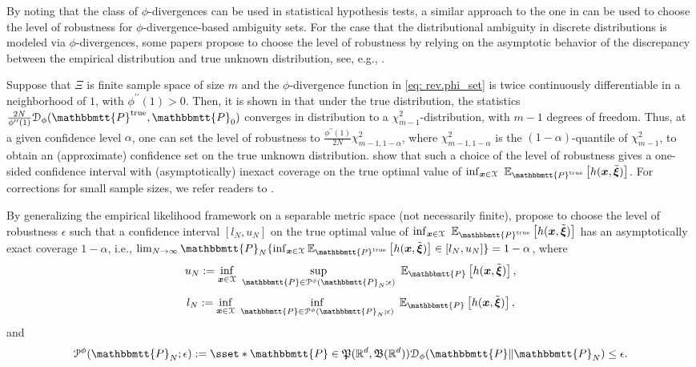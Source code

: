 \documentclass[final,onefignum,onetabnum]{class}
\newcommand{\ee}[2]{\mathbb{E}_{#1} \left[ #2 \right]}
\newcommand{\bs}[1]{\boldsymbol{#1}} %
\newcommand{\Bs}[1]{\mathbb{#1}} %
\newcommand{\Ts}[1]{\mathbbmtt{#1}} %
\newcommand{\Cs}[1]{\mathcal{#1}} %
\newcommand{\Fs}[1]{\mathfrak{#1}} %
\newcommand{\txi}{\tilde{\bs{\xi}}}
\newcommand{\nomP}{\Ts{P}_{0}}
\newcommand{\trueP}{\Ts{P}^{\text{true}}}
\renewcommand{\P}{\Fs{P}(\Bs{R}^{d},\Fs{B}(\Bs{R}^{d}))}
\begin{document}
By noting that the class of $\phi$-divergences can be used in statistical hypothesis tests, a similar approach to the one in \citet{bertsimas2018RO} can be used to choose the level of robustness for $\phi$-divergence-based ambiguity sets. For the case that the distributional ambiguity in discrete distributions  is modeled via $\phi$-divergences, some papers propose to choose the level of robustness by relying on the asymptotic behavior of the discrepancy between  the empirical distribution and true unknown distribution, see, e.g., \citet{ben2013,bayraksan2015,yanikoglu2012}. 

Suppose that $\Xi$ is finite sample space of size $m$ and the $\phi$-divergence function in \eqref{eq: rev.phi_set} is twice continuously differentiable in a neighborhood of $1$, with  $\phi^{\prime\prime}(1)>0$. Then, it is shown in \citet{pardo2005} that under the true distribution, the statistics $\frac{2N}{\phi^{\prime\prime}(1)}\Cs{D}_{\phi}(\trueP,\nomP)$ converges in distribution to a $\chi^{2}_{m-1}$-distribution, with $m-1$ degrees of freedom.
Thus, at a given confidence level $\alpha$, one can set the level of robustness to $\frac{\phi^{\prime\prime}(1)}{2N}\chi^{2}_{m-1, 1-\alpha}$, where $\chi^{2}_{m-1, 1-\alpha}$ is the $(1-\alpha)$-quantile of  $\chi^{2}_{m-1}$, to obtain an (approximate) confidence
set on the true unknown distribution.
\citet{ben2013} show that such a choice of the level of robustness gives a  one-sided confidence
interval with (asymptotically) inexact coverage on the true optimal value of $\inf_{\bs{x} \in \Cs{X}} \ \ee{\trueP}{h(\bs{x},\txi)} $. 
For corrections for small sample sizes, we refer readers to \citet{pardo2005}.

By generalizing the empirical likelihood framework \citep{owen2001empirical} on a separable metric space (not necessarily finite), \citet{duchi2016} propose to choose the level of robustness $\epsilon$ such that a confidence interval $[l_{N}, u_{N}]$ on the true optimal value of $\inf_{\bs{x} \in \Cs{X}} \ \ee{\trueP}{h(\bs{x},\txi)} $ has an asymptotically exact coverage $1-\alpha$, i.e., \linebreak $\lim_{N \rightarrow \infty} \Ts{P}_{N}\{\inf_{\bs{x} \in \Cs{X}} \ee{\trueP}{h(\bs{x},\txi)} \in [l_{N},u_{N}] \}=1-\alpha$, where 
$$u_{N}:= \inf_{\bs{x} \in \Cs{X}} \ \sup_{\Ts{P} \in \Cs{P}^{\phi}(\Ts{P}_{N}; \epsilon) } \ \ee{\Ts{P}}{h(\bs{x},\txi)}, $$
$$l_{N}:= \inf_{\bs{x} \in \Cs{X}} \ \inf_{\Ts{P} \in \Cs{P}^{\phi}(\Ts{P}_{N}; \epsilon) } \ \ee{\Ts{P}}{h(\bs{x},\txi)}, $$
and 
$$\Cs{P}^{\phi}(\Ts{P}_{N}; \epsilon):= \sset*{\Ts{P} \in \P}{ \Cs{D}_{\phi}(\Ts{P} \| \Ts{P}_{N}) \le \epsilon}.$$ 
\end{document}
